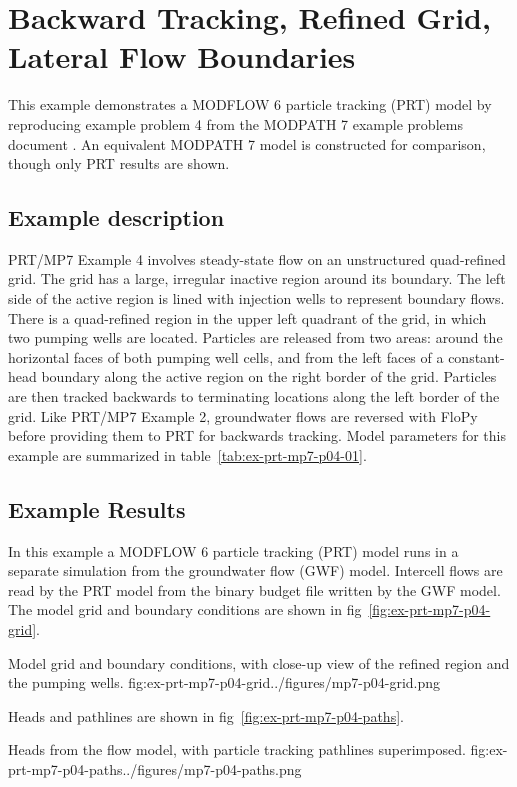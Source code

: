 \section{Backward Tracking, Refined Grid, Lateral Flow Boundaries}

This example demonstrates a MODFLOW 6 particle tracking (PRT) model by reproducing example problem 4 from the MODPATH 7 \citep{pollock2016modpath7} example problems document \citep{modpath7examples}. An equivalent MODPATH 7 model is constructed for comparison, though only PRT results are shown.

\subsection{Example description}

PRT/MP7 Example 4 involves steady-state flow on an unstructured quad-refined grid. The grid has a large, irregular inactive region around its boundary. The left side of the active region is lined with injection wells to represent boundary flows. There is a quad-refined region in the upper left quadrant of the grid, in which two pumping wells are located. Particles are released from two areas: around the horizontal faces of both pumping well cells, and from the left faces of a constant-head boundary along the active region on the right border of the grid. Particles are then tracked backwards to terminating locations along the left border of the grid. Like PRT/MP7 Example 2, groundwater flows are reversed with FloPy before providing them to PRT for backwards tracking. Model parameters for this example are summarized in table~\ref{tab:ex-prt-mp7-p04-01}.



\subsection{Example Results}

In this example a MODFLOW 6 particle tracking (PRT) model runs in a separate simulation from the groundwater flow (GWF) model. Intercell flows are read by the PRT model from the binary budget file written by the GWF model. The model grid and boundary conditions are shown in fig~\ref{fig:ex-prt-mp7-p04-grid}.

\begin{StandardFigure}{
    Model grid and boundary conditions, with close-up view of the refined region and the pumping wells.
    }{fig:ex-prt-mp7-p04-grid}{../figures/mp7-p04-grid.png}
\end{StandardFigure}

Heads and pathlines are shown in fig~\ref{fig:ex-prt-mp7-p04-paths}.

\begin{StandardFigure}{
    Heads from the flow model, with particle tracking pathlines superimposed.
    }{fig:ex-prt-mp7-p04-paths}{../figures/mp7-p04-paths.png}
\end{StandardFigure}